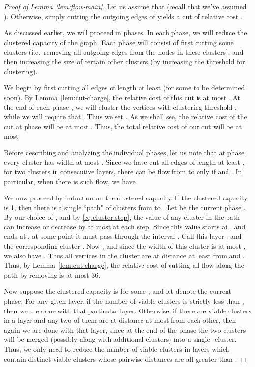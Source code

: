 \begin{proof}[Proof of Lemma~\ref{lem:flow-main}]
Let us assume that  (recall that we've assumed ). Otherwise, simply cutting the outgoing edges of  yields a cut of relative cost .

As discussed earlier, we will proceed in  phases. In each phase, we will reduce the clustered capacity of the graph. Each phase will consist of first cutting some clusters (i.e.\ removing all outgoing edges from the nodes in these clusters), and then increasing the size of certain other clusters (by increasing the threshold for clustering).

We begin by first cutting all edges of length at least  (for some  to be determined soon). By Lemma~\ref{lem:cut-charge}, the relative cost of this cut is at most . At the end of each phase , we will cluster the vertices with clustering threshold , while we will require that . Thus we set . As we shall see, the relative cost of the cut at phase  will be  at most . Thus, the total relative cost of our cut will be at most 

Before describing and analyzing the individual phases, let us note that at phase  every cluster has width at most . Since we have cut all edges of length at least , for two clusters  in consecutive layers, there can be flow from  to  only if  and . In particular, when there is such flow, we have


We now proceed by induction on the clustered capacity. If the clustered capacity is 1, then there is a single ``path" of clusters from  to . Let  be the current phase . By our choice of , and by \eqref{eq:cluster-step}, the value  of any cluster in the path can increase or decrease by at most  at each step. Since this value starts at , and ends at , at some point it must pass through the interval . Call this layer , and the corresponding cluster . Now , and since the width of this cluster is at most , we also have . Thus all vertices in the cluster are at distance at least  from  and . Thus, by Lemma~\ref{lem:cut-charge}, the relative cost of cutting all flow along the path by removing  is at most 36.

Now suppose the clustered capacity is  for some , and let  denote the current phase. For any given layer, if the number of viable clusters is strictly less than , then we are done with that particular layer. Otherwise, if there are  viable clusters in a layer and any two of them are at distance at most  from each other, then again we are done with that layer, since at the end of the phase the two clusters will be merged (possibly along with additional clusters) into a single -cluster. Thus, we only need to reduce the number of viable clusters in layers which contain  distinct viable clusters whose pairwise distances are all greater than .


\end{proof}

